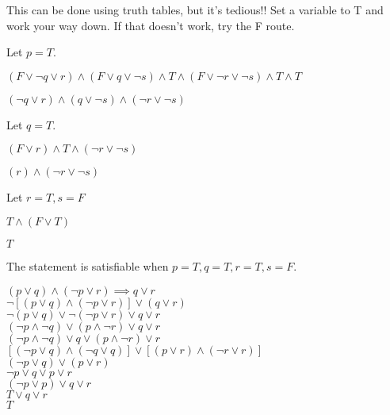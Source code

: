 \documentclass{exam}
\begin{document}
\begin{questions}
\begin{subparts}
\end{subparts}


\begin{center}
This can be done using truth tables, but it's tedious!! Set a variable to T and work your way down. If that doesn't work, try the F route.

Let \(p = T\).

\( (F \lor \neg q \lor r) \land (F \lor q \lor \neg s) \land T \land (F \lor \neg r \lor \neg s) \land T \land T \)

\( (\neg q \lor r) \land (q \lor \neg s) \land (\neg r \lor \neg s) \)

Let \(q = T\).

\( (F \lor r) \land T \land (\neg r \lor \neg s) \)

\( (r) \land (\neg r \lor \neg s) \)

Let \(r = T, s = F\)

\( T \land (F \lor T) \)

\( T \)

The statement is satisfiable when \( p = T, q = T, r = T, s = F \).

\end{center}

\newpage


\begin{center}

\(  (p \lor q) \land (\neg p \lor r) \implies q \lor r \)\\
\(  \neg[(p \lor q) \land (\neg p \lor r)] \lor (q \lor r) \)\\
\(  \neg(p \lor q) \lor \neg(\neg p \lor r) \lor q \lor r \)\\
\(  (\neg p \land \neg q) \lor ( p \land \neg r) \lor q \lor r \)\\
\(  (\neg p \land \neg q) \lor q \lor ( p \land \neg r) \lor r \)\\
\(  [ (\neg p \lor q) \land (\neg q \lor q) ] \lor [ (p \lor r) \land (\neg r \lor r) ] \)\\
\(  (\neg p \lor q) \lor (p \lor r) \)\\
\(  \neg p \lor q \lor p \lor r \)\\
\(  (\neg p \lor p) \lor q \lor r \)\\
\(  T \lor q \lor r \)\\
\(  T \)\\


\end{center}
\end{questions}
\end{document}
